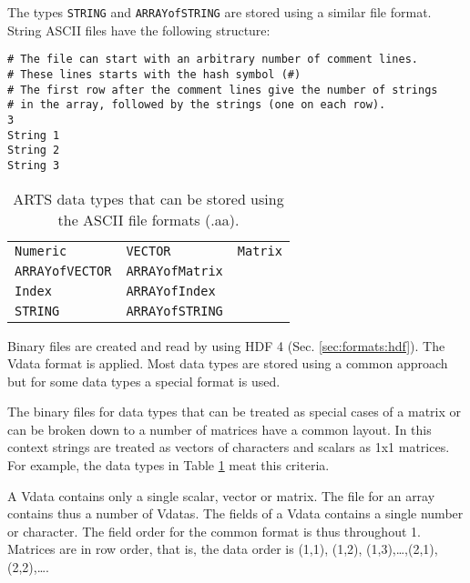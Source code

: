  The types \verb|STRING| and \verb|ARRAYofSTRING| are stored using a
 similar file format. String ASCII files have the following structure:
 {\footnotesize \begin{verbatim} 
# The file can start with an arbitrary number of comment lines.
# These lines starts with the hash symbol (#)
# The first row after the comment lines give the number of strings
# in the array, followed by the strings (one on each row).  
3
String 1
String 2
String 3
 \end{verbatim} 
}

 \begin{table}[t]
  \begin{tabular}{p{4.5cm} p{4.5cm} p{4.5cm}}
   \verb|Numeric|        & \verb|VECTOR|         & \verb|Matrix|          \\
   \verb|ARRAYofVECTOR|  & \verb|ARRAYofMatrix|  &                        \\
   \verb|Index|          & \verb|ARRAYofIndex|  &                        \\
   \verb|STRING|          & \verb|ARRAYofSTRING|  &                        \\
  \end{tabular}
  \caption{ARTS data types that can be stored using the ASCII
           file formats (.aa).}
  \label{table:format:aa}
 \end{table}
 

 \label{sec:formats:file:binary}
  
 Binary files are created and read by using HDF 4 (Sec.
 \ref{sec:formats:hdf}). The Vdata format is applied. Most data types
 are stored using a common approach but for some data types a special 
 format is used.

 \label{sec:formats:file:binary:general}
 
 The binary files for data types that can be treated as special cases
 of a matrix or can be broken down to a number of matrices have a
 common layout. In this context strings are treated as vectors of
 characters and scalars as 1x1 matrices. For example, the data types
 in Table \ref{table:format:aa} meat this criteria.
 
 A Vdata contains only a single scalar, vector or matrix. The file for
 an array contains thus a number of Vdatas. The fields of a Vdata
 contains a single number or character. The field order for the common
 format is thus throughout 1. Matrices are in row order, that is, 
 the data order is (1,1), (1,2), (1,3),\dots,(2,1),(2,2),\dots.
 
